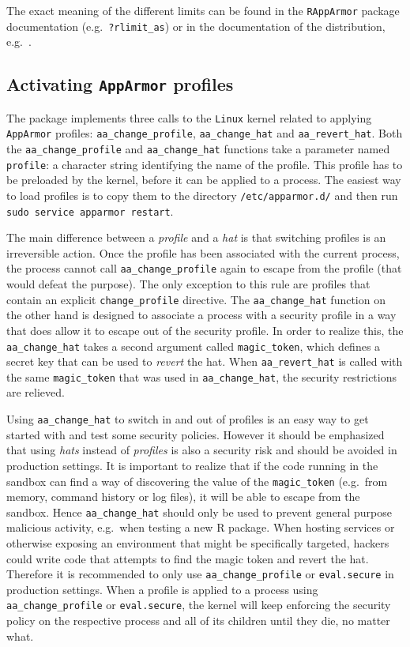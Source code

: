 \documentclass{jss}
\newcommand{\R}{\textsf{R}\xspace}
\newcommand{\AppArmor}{\texttt{AppArmor}\xspace}
\newcommand{\RAppArmor}{\pkg{RAppArmor}\xspace}
\newcommand{\Linux}{\texttt{Linux}\xspace}
\begin{document}
The exact meaning of the different limits can be found in the \texttt{RAppArmor}
package documentation (e.g.\ \texttt{?rlimit\_as}) or in the documentation of
the distribution, e.g.\ \cite{ubunturlimit}.

\subsection[Activating AppArmor profiles]{Activating \AppArmor profiles}

The \RAppArmor package implements three calls to the \Linux kernel related
to applying \AppArmor profiles: \texttt{aa\_change\_profile},
\texttt{aa\_change\_hat} and \texttt{aa\_revert\_hat}. Both the
\texttt{aa\_change\_profile} and \texttt{aa\_change\_hat} functions take a
parameter named \texttt{profile}: a character string identifying the name of
the profile. This profile has to be preloaded by the kernel, before it can be
applied to a process. The easiest way to load profiles is to copy them to the
directory \texttt{/etc/apparmor.d/} and then run \texttt{sudo service apparmor
restart}.

The main difference between a \emph{profile} and a \emph{hat} is that switching
profiles is an irreversible action. Once the profile has been associated with
the current process, the process cannot call \texttt{aa\_change\_profile} again
to escape from the profile (that would defeat the purpose). The only exception
to this rule are profiles that contain an explicit \texttt{change\_profile}
directive. The \texttt{aa\_change\_hat} function on the other hand is designed to
associate a process with a security profile in a way that does allow it to escape
out of the security profile. In order to realize this, the
\texttt{aa\_change\_hat} takes a second argument called \texttt{magic\_token},
which defines a secret key that can be used to \emph{revert} the hat. When
\texttt{aa\_revert\_hat} is called with the same \texttt{magic\_token} that
was used in \texttt{aa\_change\_hat}, the security restrictions are
relieved.

Using \texttt{aa\_change\_hat} to switch in and out of profiles is an easy way
to get started with \RAppArmor and test some security policies. However it
should be emphasized that using \emph{hats} instead of \emph{profiles} is also a
security risk and should be avoided in production settings. It is important to
realize that if the code running in the sandbox can find a way of discovering
the value of the \texttt{magic\_token} (e.g.\ from memory, command history or log
files), it will be able to escape from the sandbox. Hence
\texttt{aa\_change\_hat} should only be used to prevent general purpose
malicious activity, e.g.\ when testing a new \R package. When hosting services
or otherwise exposing an environment that might be specifically targeted,
hackers could write code that attempts to find the magic token and revert the
hat. Therefore it is recommended to only use \texttt{aa\_change\_profile} or
\texttt{eval.secure} in production settings. When a profile is applied to a
process using \texttt{aa\_change\_profile} or \texttt{eval.secure}, the kernel
will keep enforcing the security policy on the respective process and all of its
children until they die, no matter what.
\end{document}
